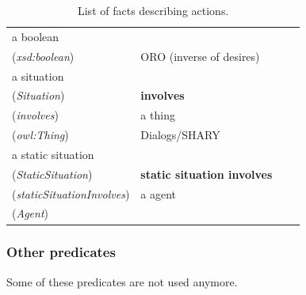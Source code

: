 \documentclass{svmult}
\begin{document}
\begin{table}[h]
\begin{tabular}{p{3cm}p{6cm}p{3cm}l}
 a boolean
\\ (\emph{xsd:boolean})  & 

 ORO (inverse of desires) \\ 


 a situation
\\ (\emph{Situation})  & 

\textbf{involves}
\\ (\emph{involves})  & 

 a thing
\\ (\emph{owl:Thing})  & 

 Dialogs/SHARY  \\ 


 a static situation
\\ (\emph{StaticSituation})  & 

\textbf{static situation involves}
\\ (\emph{staticSituationInvolves})  & 

 a agent
\\ (\emph{Agent})  & 


	\end{tabular}
	\caption{List of facts describing actions.}
\end{table}



\subsubsection{Other predicates}

Some of these predicates are not used anymore. 
\end{document}

